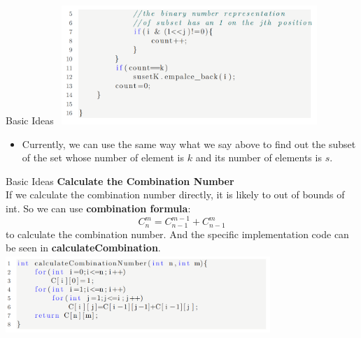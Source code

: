 \documentclass[hyperref={pdfpagelabels=false}]{beamer}
\begin{document}
\begin{frame}{Basic Ideas}
\includegraphics[width=10cm,height=4.5cm]{Figures/3.PNG}
    \begin{itemize}
        \item Currently, we can use the same way what we say above to find out the subset of the set whose number of element is $k$ and its number of elements is $s$.
    \end{itemize}
\end{frame}

\begin{frame}{Basic Ideas}
    \textbf{Calculate the Combination Number}\\
    If we calculate the combination number directly, it is likely to out of bounds of int. So we can use \textbf{combination formula}:
    \label{fol:C}$$C_n^m=C_{n-1}^{m-1}+C_{n-1}^m$$ 
    to calculate the combination number. And the specific implementation code can be seen in \textbf{calculateCombination}.\\
    \includegraphics[width=10cm,height=3cm]{Figures/4.PNG}
\end{frame}
\end{document}

